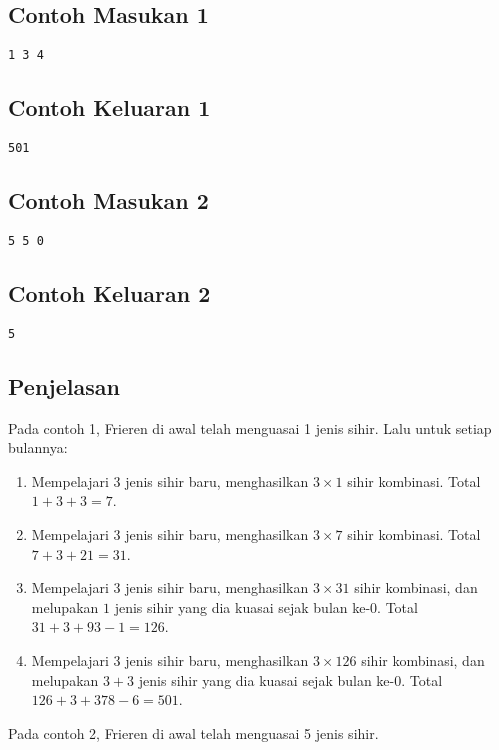 \documentclass{article}
\begin{document}
\begin{multicols}{2}
\subsection*{Contoh Masukan 1}
\begin{lstlisting}
1 3 4
\end{lstlisting}
\columnbreak
\subsection*{Contoh Keluaran 1}
\begin{lstlisting}
501
\end{lstlisting}
\vfill
\null
\end{multicols}

\begin{multicols}{2}
\subsection*{Contoh Masukan 2}
\begin{lstlisting}
5 5 0
\end{lstlisting}
\columnbreak
\subsection*{Contoh Keluaran 2}
\begin{lstlisting}
5
\end{lstlisting}
\vfill
\null
\end{multicols}

\subsection*{Penjelasan}

Pada contoh 1, Frieren di awal telah menguasai 1 jenis sihir. Lalu untuk setiap bulannya:

\begin{enumerate}
\item Mempelajari $3$ jenis sihir baru, menghasilkan $3  \times 1$ sihir kombinasi. Total $1 + 3 + 3 = 7$.
\item Mempelajari $3$ jenis sihir baru, menghasilkan $3  \times 7$ sihir kombinasi. Total $7 + 3 + 21 = 31$.
\item Mempelajari $3$ jenis sihir baru, menghasilkan $3  \times 31$ sihir kombinasi, dan melupakan $1$ jenis sihir yang dia kuasai sejak bulan ke-0. Total $31 + 3 + 93 - 1 = 126$.
\item Mempelajari $3$ jenis sihir baru, menghasilkan $3  \times 126$ sihir kombinasi, dan melupakan $3 + 3$ jenis sihir yang dia kuasai sejak bulan ke-0. Total $126 + 3 + 378 - 6 = 501$.
\end{enumerate}

Pada contoh 2, Frieren di awal telah menguasai 5 jenis sihir.
\end{document}
